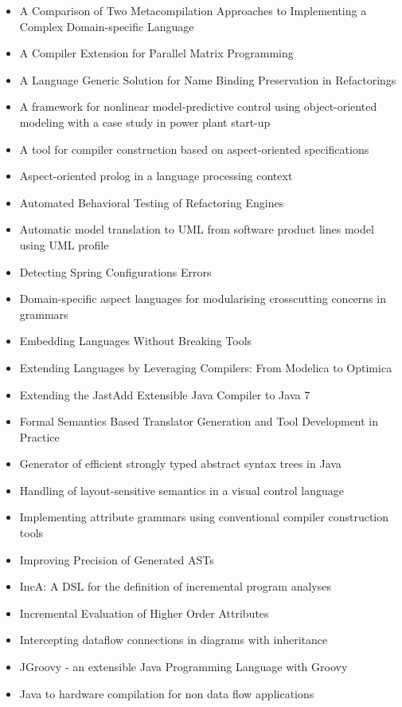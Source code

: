 \begin{itemize}
\item A Comparison of Two Metacompilation Approaches to Implementing a Complex Domain-specific Language
\item A Compiler Extension for Parallel Matrix Programming
\item A Language Generic Solution for Name Binding Preservation in Refactorings
\item A framework for nonlinear model-predictive control using object-oriented modeling with a case study in power plant start-up
\item A tool for compiler construction based on aspect-oriented specifications
\item Aspect-oriented prolog in a language processing context
\item Automated Behavioral Testing of Refactoring Engines
\item Automatic model translation to UML from software product lines model using UML profile
\item Detecting Spring Configurations Errors
\item Domain-specific aspect languages for modularising crosscutting concerns in grammars
\item Embedding Languages Without Breaking Tools
\item Extending Languages by Leveraging Compilers: From Modelica to Optimica
\item Extending the JastAdd Extensible Java Compiler to Java 7
\item Formal Semantics Based Translator Generation and Tool Development in Practice
\item Generator of efficient strongly typed abstract syntax trees in Java
\item Handling of layout-sensitive semantics in a visual control language
\item Implementing attribute grammars using conventional compiler construction tools
\item Improving Precision of Generated ASTs
\item IncA: A DSL for the definition of incremental program analyses
\item Incremental Evaluation of Higher Order Attributes
\item Intercepting dataflow connections in diagrams with inheritance
\item JGroovy - an extensible Java Programming Language with Groovy
\item Java to hardware compilation for non data flow applications

\end{itemize}
